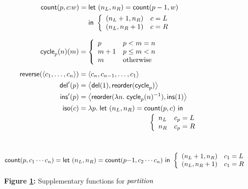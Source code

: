 \begin{figure}[!tp]
\begin{framed}
\begin{minipage}[t]{.47\linewidth}
\begin{align*}
    \mathsf{count}(p,c \mathord{:} w)
    ={}& \mathsf{let}\  (n_L,n_R) = \mathsf{count}(p-1,w) \\
    &\mathsf{in}\  \left\{\begin{array}{ll}(n_L+1,n_R) & c = L \\ (n_L,n_R+1) & c = R\end{array}\right.
\end{align*}
\else
\end{minipage}
\hfill
\begin{minipage}[t]{.45\linewidth}
\fi
    \begin{align*}
        \ml{cycle}_p(n)(m) &= \cond{
            p & p < m = n \\
            m+1 & p \le m < n \\
            m & \mbox{otherwise}
            } \\[1ex]
        \mlreverse(\blist c_1 \clist c_n \elist) &=
            \blist c_n \mlist c_{n-1} \clist c_1 \elist\\
        \mldelete'(p) &= \blist\mldel1\mlist\mlreorder{\ml{cycle}_p}\elist \\
        \mlinsert'(p) &=
            \blist\mlreorder{\lambda n.\;\ml{cycle}_p(n)^{-1}}\mlist\mlins1\elist \\
        \mliso(c) &=
           \lambda p.\;\mllet (n_L,n_R) = 
            \mlcount(p,c) \mlinm \\[-.5ex]
            & \hspace{10em}
            \cond{\mlinl{n_L} & c_p = L \\ \mlinr{n_R} & c_p = R} \\
    \end{align*}
\ifdissertation\else
\end{minipage}\\[-2ex]
\fi
\ifdissertation
\else
\begin{align*}
    \mlcount(p,c_1 \cdots c_n)
    ={}& \mllet (n_L,n_R) = \mlcount(p\mathord{-}1,c_2 \cdots c_n) \mline\ 
    \cond{(n_L+1,n_R) & c_1 = L \\ (n_L,n_R+1) & c_1 = R}
\end{align*}
\fi
\vspace{-1ex}
\end{framed}
\vspace*{-2ex}
\makeatletter{}\makeatother
\label{fig:definition-partition-supplementary}
\begin{center}
{\bf Figure \ref{fig:definition-partition-supplementary}:} Supplementary functions for $\mathit{partition}$
\end{center}
\ifdissertation\draftspaced\fi
\end{figure}

